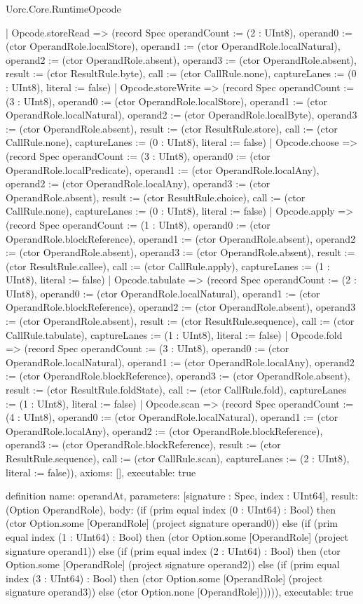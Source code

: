 \begin{lexlean}{Uorc.Core.RuntimeOpcode}
\begin{semanticmodule}
{    | Opcode.storeRead => (record Spec {operandCount := (2 : UInt8), operand0 := (ctor OperandRole.localStore), operand1 := (ctor OperandRole.localNatural), operand2 := (ctor OperandRole.absent), operand3 := (ctor OperandRole.absent), result := (ctor ResultRule.byte), call := (ctor CallRule.none), captureLanes := (0 : UInt8), literal := false})
    | Opcode.storeWrite => (record Spec {operandCount := (3 : UInt8), operand0 := (ctor OperandRole.localStore), operand1 := (ctor OperandRole.localNatural), operand2 := (ctor OperandRole.localByte), operand3 := (ctor OperandRole.absent), result := (ctor ResultRule.store), call := (ctor CallRule.none), captureLanes := (0 : UInt8), literal := false})
    | Opcode.choose => (record Spec {operandCount := (3 : UInt8), operand0 := (ctor OperandRole.localPredicate), operand1 := (ctor OperandRole.localAny), operand2 := (ctor OperandRole.localAny), operand3 := (ctor OperandRole.absent), result := (ctor ResultRule.choice), call := (ctor CallRule.none), captureLanes := (0 : UInt8), literal := false})
    | Opcode.apply => (record Spec {operandCount := (1 : UInt8), operand0 := (ctor OperandRole.blockReference), operand1 := (ctor OperandRole.absent), operand2 := (ctor OperandRole.absent), operand3 := (ctor OperandRole.absent), result := (ctor ResultRule.callee), call := (ctor CallRule.apply), captureLanes := (1 : UInt8), literal := false})
    | Opcode.tabulate => (record Spec {operandCount := (2 : UInt8), operand0 := (ctor OperandRole.localNatural), operand1 := (ctor OperandRole.blockReference), operand2 := (ctor OperandRole.absent), operand3 := (ctor OperandRole.absent), result := (ctor ResultRule.sequence), call := (ctor CallRule.tabulate), captureLanes := (1 : UInt8), literal := false})
    | Opcode.fold => (record Spec {operandCount := (3 : UInt8), operand0 := (ctor OperandRole.localNatural), operand1 := (ctor OperandRole.localAny), operand2 := (ctor OperandRole.blockReference), operand3 := (ctor OperandRole.absent), result := (ctor ResultRule.foldState), call := (ctor CallRule.fold), captureLanes := (1 : UInt8), literal := false})
    | Opcode.scan => (record Spec {operandCount := (4 : UInt8), operand0 := (ctor OperandRole.localNatural), operand1 := (ctor OperandRole.localAny), operand2 := (ctor OperandRole.blockReference), operand3 := (ctor OperandRole.blockReference), result := (ctor ResultRule.sequence), call := (ctor CallRule.scan), captureLanes := (2 : UInt8), literal := false})),
  axioms: [],
  executable: true
}

definition{
  name: operandAt,
  parameters: [signature : Spec, index : UInt64],
  result: (Option OperandRole),
  body: (if (prim equal index (0 : UInt64) : Bool) then (ctor Option.some [OperandRole] (project signature operand0)) else (if (prim equal index (1 : UInt64) : Bool) then (ctor Option.some [OperandRole] (project signature operand1)) else (if (prim equal index (2 : UInt64) : Bool) then (ctor Option.some [OperandRole] (project signature operand2)) else (if (prim equal index (3 : UInt64) : Bool) then (ctor Option.some [OperandRole] (project signature operand3)) else (ctor Option.none [OperandRole]))))),
  executable: true
}
\end{semanticmodule}
\end{lexlean}
